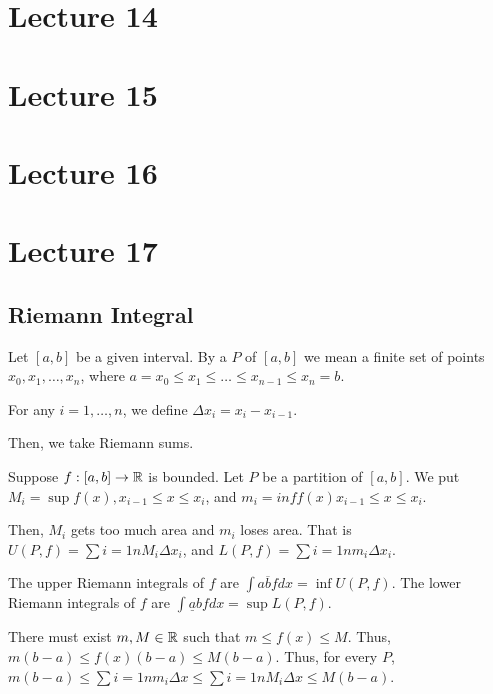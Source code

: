 \documentclass{book}
\begin{document}
\section{Lecture 14}
\section{Lecture 15}
\section{Lecture 16}
\begin{thm}
\end{thm}

\begin{thm}
\end{thm}
\section{Lecture 17}
\subsection{Riemann Integral}
\begin{defn}
    Let $[a, b]$ be a given interval. By a  $P$ of $[a, b]$ we mean a finite set of points $x_0, x_1, \ldots, x_n$, where $a = x_0 \leq x_1 \leq \ldots \leq x_{n - 1} \leq x_n = b$.

    For any $i = 1, \ldots, n$, we define $\Delta x_i = x_i - x_{i - 1}$. 
\end{defn}

Then, we take Riemann sums.

Suppose $f : [a, b] \to \mathbb{R}$ is bounded. Let $P$ be a partition of $[a, b]$. We put $M_i = \sup f(x), x_{i-1} \leq x \leq x_i$, and $m_i = inf f(x) x_{i-1} \leq x \leq x_i$. 

Then, $M_i$ gets too much area and $m_i$ loses area. That is $U(P, f) = \sum{i = 1}{n} M_i \Delta x_i$, and $L(P, f) = \sum{i = 1}{n} m_i \Delta x_i$. 

The upper Riemann integrals of $f$ are $\int{a}{\overline b} f dx = \inf U(P, f)$. The lower Riemann integrals of $f$ are $\int{\underline a}{b} f dx = \sup L(P, f)$.

There must exist $m, M \in \mathbb{R}$ such that $m \leq f(x) \leq M$. Thus, $m(b - a) \leq f(x)(b - a) \leq M(b - a)$. Thus, for every $P$, $m(b - a) \leq \sum{i = 1}{n} m_i \Delta x \leq \sum{i = 1}{n} M_i \Delta x \leq M(b - a)$.
\end{document}
